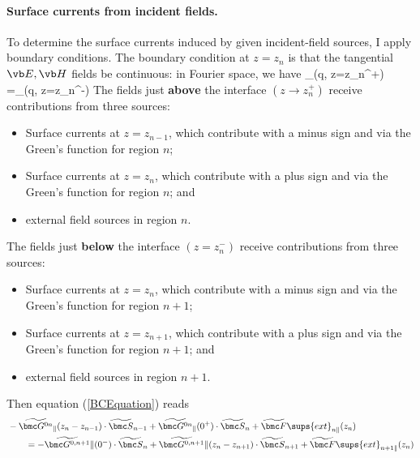 \documentclass[letterpaper]{article}
\renewcommand{\wt}{\widetilde}
\begin{document}
\paragraph{Surface currents from incident fields.}

To determine the surface currents induced by given incident-field
sources, I apply boundary conditions.
The boundary condition at $z=z_n$ is that the tangential $\vb E, \vb H$
fields be continuous: in Fourier space, we have
{ \wt{\bmc F}_{\parallel}(\vb q, z=z_n^+)
 =\wt{\bmc F}_{\parallel}(\vb q, z=z_n^-)
}
The fields just \textbf{above} the interface $(z\to z_n^+)$ receive
contributions from three sources:
\begin{itemize}
 \item Surface currents at $z=z_{n-1}$, which contribute with
       a minus sign and via the Green's function for region $n$;
 \item Surface currents at $z=z_{n}$, which contribute with
       a plus sign and via the Green's function for region $n$; and
 \item external field sources in region $n$.
\end{itemize}
The fields just \textbf{below} the interface $(z=z_n^-)$ receive
contributions from three sources:
\begin{itemize}
 \item Surface currents at $z=z_{n}$, which contribute with
       a minus sign and via the Green's function for region $n+1$;
 \item Surface currents at $z=z_{n+1}$, which contribute with
       a plus sign and via the Green's function for region $n+1$; and
 \item external field sources in region $n+1$.
\end{itemize}
Then equation (\ref{BCEquation}) reads
\begin{align*}
&
-\wt{\bmc G^{0n}}_{\parallel}(z_n-z_{n-1})\cdot \wt{\bmc S}_{n-1}
+\wt{\bmc G^{0n}}_{\parallel}(0^+) \cdot \wt{\bmc S}_{n}
+\wt{\bmc F}\sups{ext}_{n\parallel}(z_n)
\\
&\qquad=
-\wt{\bmc G^{0,n+1}}{\parallel}(0^-) \cdot \wt{\bmc S}_{n}
+\wt{\bmc G^{0,n+1}}{\parallel}(z_n-z_{n+1})\cdot \wt{\bmc S}_{n+1}
+\wt{\bmc F}\sups{ext}_{n+1\parallel}(z_n)
\end{align*}
\end{document}
